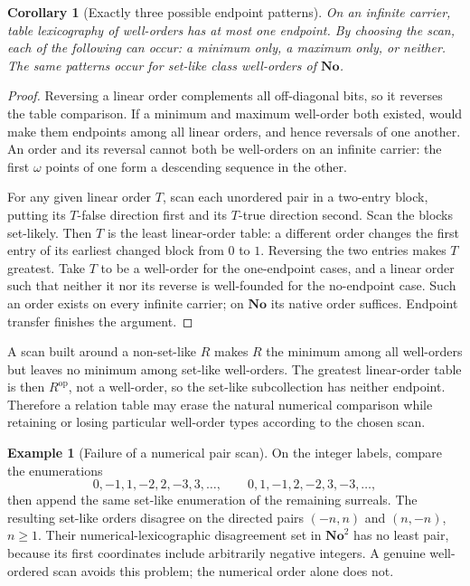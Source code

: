 \documentclass[11pt]{article}
\newtheorem{corollary}[corollary]{Corollary}
\theoremstyle{definition}
\newtheorem{example}[example]{Example}
\theoremstyle{remark}
\newcommand{\No}{\mathbf{No}}
\begin{document}
\begin{corollary}[Exactly three possible endpoint patterns]\label{swo:cb:cor:tablepatterns}
On an infinite carrier, table lexicography of well-orders has at most one
endpoint. By choosing the scan, each of the following can occur: a minimum
only, a maximum only, or neither. The same patterns occur for set-like
class well-orders of $\No$.
\end{corollary}
\begin{proof}
Reversing a linear order complements all off-diagonal bits, so it reverses
the table comparison. If a minimum and maximum well-order both existed,
 would make them endpoints among all linear
orders, and hence reversals of one another. An order and its reversal
cannot both be well-orders on an infinite carrier: the first $\omega$
points of one form a descending sequence in the other.

For any given linear order $T$, scan each unordered pair in a two-entry
block, putting its $T$-false direction first and its $T$-true direction
second. Scan the blocks set-likely. Then $T$ is the least linear-order
table: a different order changes the first entry of its earliest changed
block from $0$ to $1$. Reversing the two entries makes $T$ greatest.
Take $T$ to be a well-order for the one-endpoint cases, and a linear order
such that neither it nor its reverse is well-founded for the no-endpoint
case. Such an order exists on every infinite carrier; on $\No$ its
native order suffices. Endpoint transfer finishes the argument.
\end{proof}

A scan built around a non-set-like $R$ makes $R$ the minimum among all
well-orders but leaves no minimum among set-like well-orders. The greatest
linear-order table is then $R^{\mathrm{op}}$, not a well-order, so the
set-like subcollection has neither endpoint. Therefore a relation table
may erase the natural numerical comparison while retaining or losing
particular well-order types according to the chosen scan.

\begin{example}[Failure of a numerical pair scan]\label{swo:cb:n10.4}
On the integer labels, compare the enumerations
\[
 0,-1,1,-2,2,-3,3,\ldots,
 \qquad
 0,1,-1,2,-2,3,-3,\ldots,
\]
then append the same set-like enumeration of the remaining surreals.
The resulting set-like orders disagree on the directed pairs
$(-n,n)$ and $(n,-n)$, $n\geq1$. Their numerical-lexicographic
disagreement set in $\No^2$ has no least pair, because its first
coordinates include arbitrarily negative integers. A genuine well-ordered
scan avoids this problem; the numerical order alone does not.
\end{example}
\end{document}
